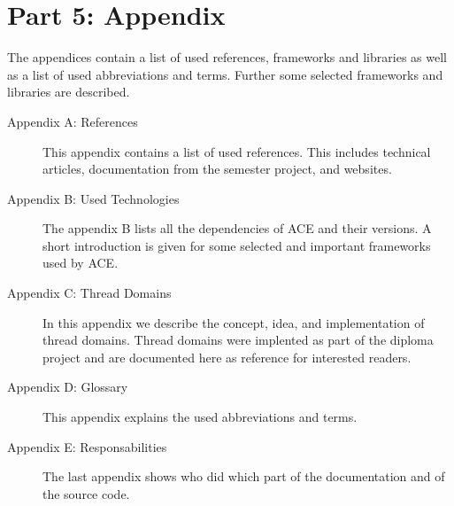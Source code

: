  
\section*{Part 5: Appendix}
The appendices contain a list of used references, frameworks and libraries as well as a list of used abbreviations and terms. Further some selected frameworks and libraries
are described.

\begin{description}
 \item[Appendix A: References] This appendix contains a list of used references. This includes technical articles, documentation from the semester project, and websites.
 \item[Appendix B: Used Technologies] The appendix B lists all the dependencies of ACE and their versions. A short introduction is given for some selected and important frameworks used by ACE.
 \item[Appendix C: Thread Domains] In this appendix we describe the concept, idea, and implementation of thread domains. Thread domains were implented as part of the diploma project and are documented here as reference for interested readers.
 \item[Appendix D: Glossary] This appendix explains the used abbreviations and terms.
 \item[Appendix E: Responsabilities] The last appendix shows who did which part of the documentation and of the source code.
\end{description}
